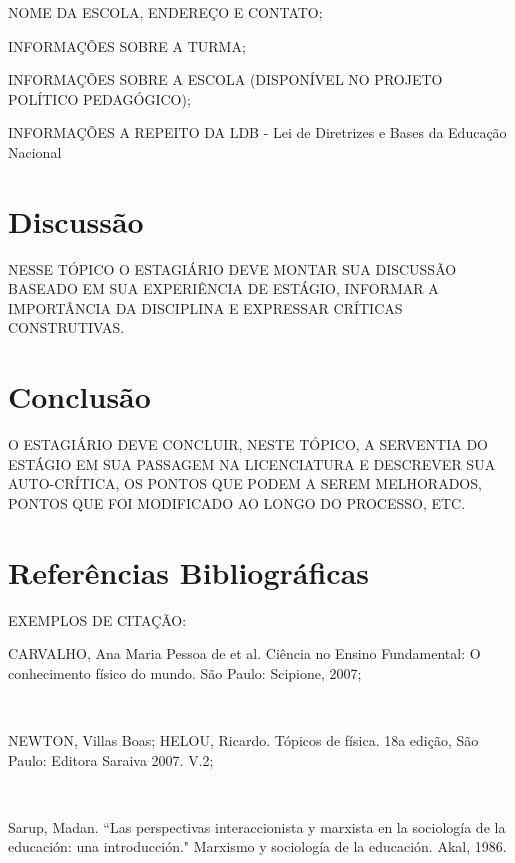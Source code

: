 \documentclass[a4paper, 12 pt]{article}                                	%
\begin{document}
	NOME DA ESCOLA, ENDEREÇO E CONTATO;
	
	INFORMAÇÕES SOBRE A TURMA;
	
	INFORMAÇÕES SOBRE A ESCOLA (DISPONÍVEL NO PROJETO POLÍTICO PEDAGÓGICO);
	
	INFORMAÇÕES A REPEITO DA LDB - Lei de Diretrizes e Bases da Educação Nacional
	
	\newpage
	\section{Discussão}
	
	NESSE TÓPICO O ESTAGIÁRIO DEVE MONTAR SUA DISCUSSÃO BASEADO EM SUA EXPERIÊNCIA DE ESTÁGIO, INFORMAR A IMPORTÂNCIA DA DISCIPLINA E EXPRESSAR CRÍTICAS CONSTRUTIVAS.
	
	
	\newpage
	\section{Conclusão}
	
	O ESTAGIÁRIO DEVE CONCLUIR, NESTE TÓPICO, A SERVENTIA DO ESTÁGIO EM SUA PASSAGEM NA LICENCIATURA E DESCREVER SUA AUTO-CRÍTICA, OS PONTOS QUE PODEM A SEREM MELHORADOS, PONTOS QUE FOI MODIFICADO AO LONGO DO PROCESSO, ETC.
	
	
	\newpage
	\section{Referências Bibliográficas}   
	
	EXEMPLOS DE CITAÇÃO:
	
	
	CARVALHO, Ana Maria Pessoa de et al. Ciência no Ensino Fundamental: O conhecimento físico do mundo. São Paulo: Scipione, 2007;
	
	\
	
	NEWTON, Villas Boas; HELOU, Ricardo. Tópicos de física. 18a edição, São Paulo: Editora Saraiva 2007. V.2;
	
	\
	
	Sarup, Madan. ``Las perspectivas interaccionista y marxista en la sociología de la educación: una introducción." Marxismo y sociología de la educación. Akal, 1986.
	
	\newpage
	
	\appendix
\end{document}
